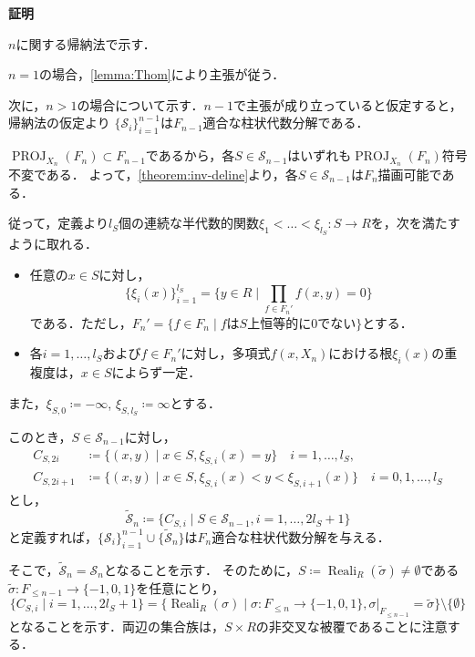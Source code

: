 \documentclass[uplatex, dvipdfmx]{jsarticle}
\makeatletter
\numberwithin{equation}{section}
\renewenvironment{proof}[1][\proofname]{\par
  \pushQED{\qed}%
  \normalfont \topsep6\p@\@plus6\p@\relax
  \trivlist
  \item\relax
  {\bfseries
  #1\@addpunct{.}}\hspace\labelsep\ignorespaces
}{
  \popQED\endtrivlist\@endpefalse
}
\newcommand{\map}[3]{{#1}\colon{#2}\rightarrow{#3}}
\DeclareMathOperator{\PROJ}{PROJ}
\DeclareMathOperator{\Reali}{Reali}
\theoremstyle{definition}
\renewcommand{\proofname}{\textbf{証明}}
\makeatother
\begin{document}
\begin{proof}
     $n$に関する帰納法で示す．

     $n=1$の場合，\cref{lemma:Thom}により主張が従う．

     次に，$n>1$の場合について示す．$n-1$で主張が成り立っていると仮定すると，帰納法の仮定より
     $\{\mathcal{S}_{i}\}_{i=1}^{n-1}$は$F_{n-1}$適合な柱状代数分解である．

     $\PROJ_{X_n}(F_n) \subset F_{n-1}$であるから，各$S \in \mathcal{S}_{n-1}$はいずれも$\PROJ_{X_n}(F_n)$符号不変である．
     よって，\cref{theorem:inv-deline}より，各$S \in \mathcal{S}_{n-1}$は$F_n$描画可能である．

     従って，定義より$l_S$個の連続な半代数的関数$\map{\xi_1<\dots<\xi_{l_S}}{S}{R}$を，次を満たすように取れる．
     \begin{itemize}
          \item 任意の$ x \in S $に対し，
          \begin{equation}
               \{\xi_i(x)\}_{i=1}^{l_S} = \{y \in R \mid \prod_{f \in F_n'}f(x,y)=0\}
          \end{equation}
          である．ただし，$F_n' = \{f \in F_n \mid \text{$f$は$S$上恒等的に$0$でない}\}$とする．
          \item 各$i=1, \dots, l_S$および$f \in F_n'$に対し，多項式$f(x,X_n)$における根$\xi_i(x)$の重複度は，$x\in S$によらず一定．
     \end{itemize}
     また，$\xi_{S,0} \coloneqq -\infty$, $\xi_{S,l_S} \coloneqq \infty$とする．

     このとき，$S \in \mathcal{S}_{n-1}$に対し，
     \begin{align}
          C_{S,2i} &\coloneqq \{(x,y) \mid  x \in S, \xi_{S,i}(x) = y \} \quad i = 1,\dots, l_S,\\
          C_{S,2i+1} &\coloneqq \{(x,y) \mid x \in S, \xi_{S,i}(x)<y<\xi_{S,i+1}(x) \} \quad i = 0,1, \dots, l_S 
     \end{align}
     とし，
     \begin{equation}
          \widetilde{\mathcal{S}}_n \coloneqq \{C_{S,i} \mid S \in \mathcal{S}_{n-1}, i=1, \dots, 2l_S+1 \}
     \end{equation}
     と定義すれば，$\{\mathcal{S}_i\}_{i=1}^{n-1} \cup \{\widetilde{\mathcal{S}}_n\}$は$F_n$適合な柱状代数分解を与える．

     そこで，$\widetilde{\mathcal{S}}_n = \mathcal{S}_n$となることを示す．
     そのために，$S\coloneqq \Reali_R(\widetilde{\sigma}) \neq \emptyset$である$\map{\widetilde{\sigma}}{F_{\leq n-1}}{\{-1,0,1\}}$を任意にとり，
     \begin{equation}
          \{C_{S,i} \mid i=1, \dots, 2l_S + 1\} = \{\Reali_R(\sigma) \mid \map{\sigma}{F_{\leq n}}{\{-1,0,1\}}, \sigma|_{F_{\leq n-1}} = \widetilde{\sigma}\} \setminus \{\emptyset\}
     \end{equation}
     となることを示す．両辺の集合族は，$S \times R$の非交叉な被覆であることに注意する．


\end{proof}
\end{document}
